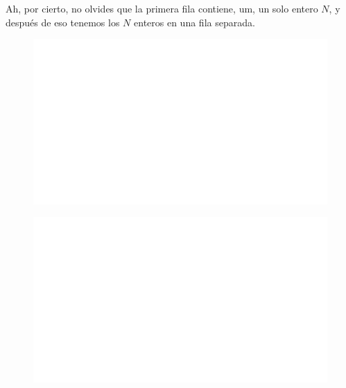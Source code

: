 Ah, por cierto, no olvides que la primera fila contiene, um, un solo entero $N$, y después de eso tenemos los $N$ enteros en una fila separada.

\begin{centering}
    \begin{figure}[h]
        \centering
        \includegraphics[width=\textwidth]{whyareyoucheckingthenameofthisfile.png}
    \end{figure}
\end{centering}

\begin{centering}
    \begin{figure}[h!]
        \centering
        \includegraphics[width=\textwidth]{whyareyoucheckingthenameofthisfile.png}
    \end{figure}
\end{centering}

